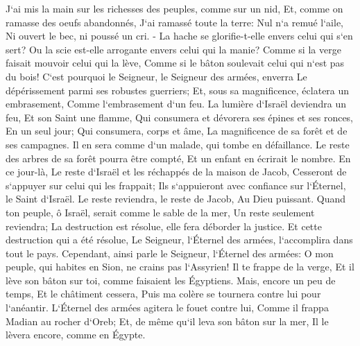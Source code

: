 \verse J`ai mis la main sur les richesses des peuples, comme sur un nid, Et, comme on ramasse des oeufs abandonnés, J`ai ramassé toute la terre: Nul n`a remué l`aile, Ni ouvert le bec, ni poussé un cri. - 
\verse La hache se glorifie-t-elle envers celui qui s`en sert? Ou la scie est-elle arrogante envers celui qui la manie? Comme si la verge faisait mouvoir celui qui la lève, Comme si le bâton soulevait celui qui n`est pas du bois! 
\verse C`est pourquoi le Seigneur, le Seigneur des armées, enverra Le dépérissement parmi ses robustes guerriers; Et, sous sa magnificence, éclatera un embrasement, Comme l`embrasement d`un feu. 
\verse La lumière d`Israël deviendra un feu, Et son Saint une flamme, Qui consumera et dévorera ses épines et ses ronces, En un seul jour; 
\verse Qui consumera, corps et âme, La magnificence de sa forêt et de ses campagnes. Il en sera comme d`un malade, qui tombe en défaillance. 
\verse Le reste des arbres de sa forêt pourra être compté, Et un enfant en écrirait le nombre. 
\verse En ce jour-là, Le reste d`Israël et les réchappés de la maison de Jacob, Cesseront de s`appuyer sur celui qui les frappait; Ils s`appuieront avec confiance sur l`Éternel, le Saint d`Israël. 
\verse Le reste reviendra, le reste de Jacob, Au Dieu puissant. 
\verse Quand ton peuple, ô Israël, serait comme le sable de la mer, Un reste seulement reviendra; La destruction est résolue, elle fera déborder la justice. 
\verse Et cette destruction qui a été résolue, Le Seigneur, l`Éternel des armées, l`accomplira dans tout le pays. 
\verse Cependant, ainsi parle le Seigneur, l`Éternel des armées: O mon peuple, qui habites en Sion, ne crains pas l`Assyrien! Il te frappe de la verge, Et il lève son bâton sur toi, comme faisaient les Égyptiens. 
\verse Mais, encore un peu de temps, Et le châtiment cessera, Puis ma colère se tournera contre lui pour l`anéantir. 
\verse L`Éternel des armées agitera le fouet contre lui, Comme il frappa Madian au rocher d`Oreb; Et, de même qu`il leva son bâton sur la mer, Il le lèvera encore, comme en Égypte. 
